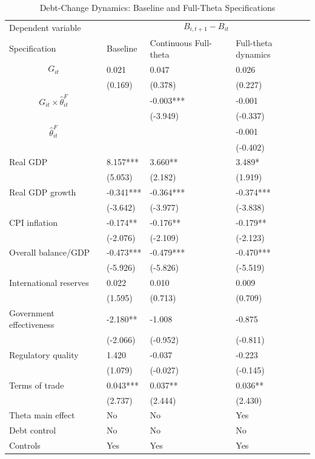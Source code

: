 \begin{table}[H]\centering
\begin{threeparttable}
\caption{Debt-Change Dynamics: Baseline and Full-Theta Specifications}
\label{tab:debt_change_combined_fulltheta}
\scriptsize
\begin{tabularx}{\textwidth}{lYYY}
\toprule
Dependent variable &  \\
\cmidrule(lr){2-4}
Specification & Baseline & Continuous Full-theta & Full-theta dynamics \\
\midrule
$$G_{it}$$ & 0.021 & 0.047 & 0.026 \\
 & (0.169) & (0.378) & (0.227) \\
$$G_{it}\times\widehat{\theta}^{F}_{it}$$ &  & -0.003*** & -0.001 \\
 &  & (-3.949) & (-0.337) \\
$$\widehat{\theta}^{F}_{it}$$ &  &  & -0.001 \\
 &  &  & (-0.402) \\
Real GDP & 8.157*** & 3.660** & 3.489* \\
 & (5.053) & (2.182) & (1.919) \\
Real GDP growth & -0.341*** & -0.364*** & -0.374*** \\
 & (-3.642) & (-3.977) & (-3.838) \\
CPI inflation & -0.174** & -0.176** & -0.179** \\
 & (-2.076) & (-2.109) & (-2.123) \\
Overall balance/GDP & -0.473*** & -0.479*** & -0.470*** \\
 & (-5.926) & (-5.826) & (-5.519) \\
International reserves & 0.022 & 0.010 & 0.009 \\
 & (1.595) & (0.713) & (0.709) \\
Government effectiveness & -2.180** & -1.008 & -0.875 \\
 & (-2.066) & (-0.952) & (-0.811) \\
Regulatory quality & 1.420 & -0.037 & -0.223 \\
 & (1.079) & (-0.027) & (-0.145) \\
Terms of trade & 0.043*** & 0.037** & 0.036** \\
 & (2.737) & (2.444) & (2.430) \\
\midrule
Theta main effect & No & No & Yes \\
Debt control & No & No & No \\
Controls & Yes & Yes & Yes \\

\end{tabularx}
\end{threeparttable}
\end{table}
